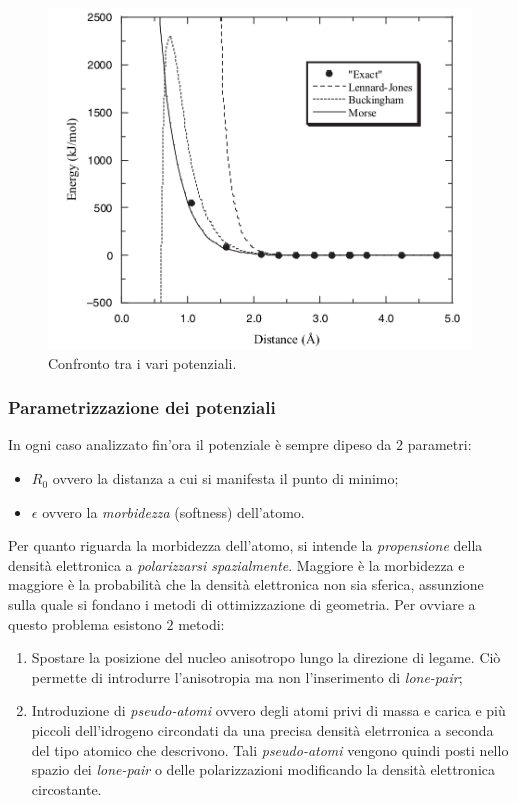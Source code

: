 \documentclass[oneside]{amsbook}
\numberwithin{section}{chapter}
\numberwithin{equation}{section}
\numberwithin{figure}{section}
\begin{document}
\begin{figure} [H]
\label{vdwfig}
\centering
\caption{Confronto tra i vari potenziali.}
\includegraphics[scale=0.3]{vdw}
\end{figure}

\subsubsection{Parametrizzazione dei potenziali}
In ogni caso analizzato fin'ora il potenziale è sempre dipeso da $2$ parametri:
\begin{itemize}
\item $R_0$ ovvero la distanza a cui si manifesta il punto di minimo;
\item $\epsilon$ ovvero la \emph{morbidezza} (softness) dell'atomo.
\end{itemize}
Per quanto riguarda la morbidezza dell'atomo, si intende la \emph{propensione} della densità elettronica a \emph{polarizzarsi spazialmente}. Maggiore è la morbidezza e maggiore è la probabilità che la densità elettronica non sia sferica, assunzione sulla quale si fondano i metodi di ottimizzazione di geometria. Per ovviare a questo problema esistono $2$ metodi:
\begin{enumerate}
\item Spostare la posizione del nucleo anisotropo lungo la direzione di legame. Ciò permette di introdurre l'anisotropia ma non l'inserimento di \emph{lone-pair};
\item Introduzione di \emph{pseudo-atomi} ovvero degli atomi privi di massa e carica e più piccoli dell'idrogeno circondati da una precisa densità eletrronica a seconda del tipo atomico che descrivono. Tali \emph{pseudo-atomi} vengono quindi posti nello spazio dei \emph{lone-pair} o delle polarizzazioni modificando la densità elettronica circostante. 
\end{enumerate}
\end{document}
